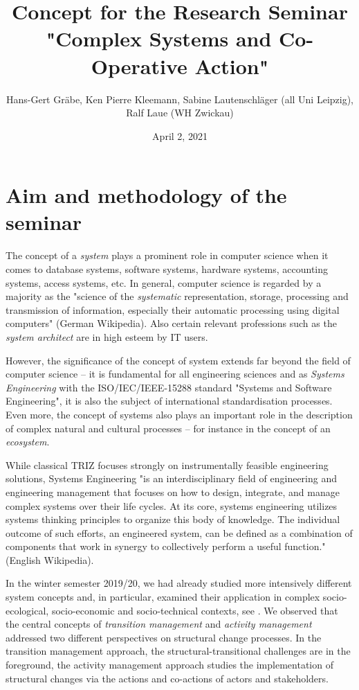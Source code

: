 \documentclass[11pt,a4paper]{article}
\title{Concept for the Research Seminar\\ "Complex Systems and Co-Operative
  Action"}
\author{Hans-Gert Gr\"abe, Ken Pierre Kleemann, Sabine Lautenschläger (all
  Uni Leipzig),\\ Ralf Laue (WH Zwickau) }
\date{April 2, 2021}
\begin{document}
\maketitle

\section{Aim and methodology of the seminar}

The concept of a \emph{system} plays a prominent role in computer science when
it comes to database systems, software systems, hardware systems, accounting
systems, access systems, etc.  In general, computer science is regarded by a
majority as the "science of the \emph{systematic} representation, storage,
processing and transmission of information, especially their automatic
processing using digital computers" (German Wikipedia).  Also certain relevant
professions such as the \emph{system architect} are in high esteem by IT
users.

However, the significance of the concept of system extends far beyond the
field of computer science -- it is fundamental for all engineering sciences
and as \emph{Systems Engineering} with the ISO/IEC/IEEE-15288 standard
"Systems and Software Engineering", it is also the subject of international
standardisation processes.  Even more, the concept of systems also plays an
important role in the description of complex natural and cultural processes --
for instance in the concept of an \emph{ecosystem}.

While classical TRIZ focuses strongly on instrumentally feasible engineering
solutions, Systems Engineering "is an interdisciplinary field of engineering
and engineering management that focuses on how to design, integrate, and
manage complex systems over their life cycles. At its core, systems
engineering utilizes systems thinking principles to organize this body of
knowledge. The individual outcome of such efforts, an engineered system, can
be defined as a combination of components that work in synergy to collectively
perform a useful function." (English Wikipedia). 

In the winter semester 2019/20, we had already studied more intensively
different system concepts and, in particular, examined their application in
complex socio-ecological, socio-economic and socio-technical contexts, see
\cite{Graebe2020}. We observed that the central concepts of \emph{transition
  management} and \emph{activity management} addressed two different
perspectives on structural change processes. In the transition management
approach, the structural-transitional challenges are in the foreground, the
activity management approach studies the implementation of structural changes
via the actions and co-actions of actors and stakeholders.
\end{document}
